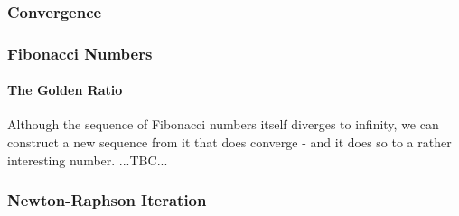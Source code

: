 


\subsubsection{Convergence}

\subsubsection{Fibonacci Numbers}



\paragraph{The Golden Ratio}
Although the sequence of Fibonacci numbers itself diverges to infinity, we can construct a new sequence from it that does converge - and it does so to a rather interesting number. ...TBC...


\subsubsection{Newton-Raphson Iteration}



